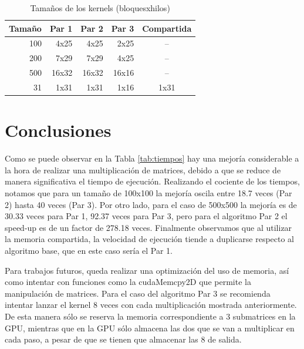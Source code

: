 \documentclass{article}
\begin{document}
\begin{table}[H]
\centering
	\begin{tabular}{rrrrc}
		\hline\hline
		\textbf{Tamaño} & \textbf{Par 1} & \textbf{Par 2} & \textbf{Par 3}&\textbf{Compartida}\\
		\hline
		100 &  4x25 & 4x25&2x25&--\\
		200 & 7x29 &	7x29 & 4x25&--\\
		500	&16x32&16x32&16x16&--\\
		31 &1x31&1x31&1x16&1x31\\


		\hline
	\end{tabular}
	\caption{Tamaños de los kernels (bloquesxhilos)}
	\label{tab:hilos}
\end{table}

\section{Conclusiones}
Como se puede observar en la Tabla \ref{tab:tiempos} hay una mejoría considerable a la hora de realizar una multiplicación de matrices, debido a que se reduce de manera significativa el tiempo de ejecución. Realizando el cociente de los tiempos, notamos que para un tamaño de 100x100 la mejoría oscila entre 18.7 veces (Par 2) hasta 40 veces (Par 3). Por otro lado, para el caso de 500x500 la mejoría es de 30.33 veces para Par 1, 92.37 veces para Par 3, pero para el algoritmo Par 2 el speed-up es de un factor de 278.18 veces. Finalmente observamos que al utilizar la memoria compartida, la velocidad de ejecución tiende a duplicarse respecto al algoritmo base, que en este caso sería el Par 1.

Para trabajos futuros, queda realizar una optimización del uso de memoria, así como intentar con funciones como la cudaMemcpy2D que permite la manipulación de matrices. Para el caso del algoritmo Par 3 se recomienda intentar lanzar el kernel 8 veces con cada multiplicación mostrada anteriormente. De esta manera sólo se reserva la memoria correspondiente a 3 submatrices en la GPU, mientras que en la GPU sólo almacena las dos que se van a multiplicar en cada paso, a pesar de que se tienen que almacenar las 8 de salida. 
\nocite{*}
 

\end{document}
